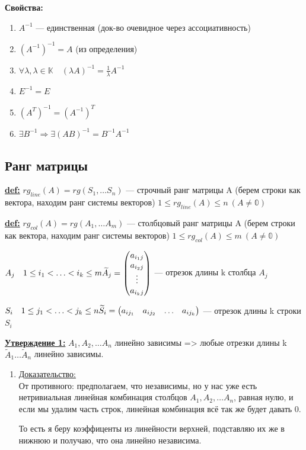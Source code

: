 \documentclass[twoside]{book}
\newcommand{\prooff}[1]{{\underline{Доказательство:}} \\ }
\begin{document}
\textbf{Свойства:}
\begin{enumerate}
    \item $ A^{-1} $ --- единственная (док-во очевидное через ассоциативность)
    \item $ (A^{-1})^{-1} = A $ (из определения)
    \item $ \forall \lambda, \lambda \in \mathbb{K} \quad (\lambda A)^{-1} = \frac{1}{\lambda}A^{-1}$
    \item $ E^{-1} = E $
    \item $ (A^T)^{-1} = (A^{-1})^T $
    \item $ \exists B^{-1} \Rightarrow \exists (AB)^{-1} = B^{-1}A^{-1}$
\end{enumerate}

\subsection{Ранг матрицы}

\textbf{\underline{def:}} $ rg_{line}(A) = rg(S_1, \ldots S_n)$ --- строчный ранг матрицы A (берем строки как вектора, находим ранг системы векторов) $ 1 \leq rg_{line}(A) \leq n \  (A \neq \mathbb{0})$

\textbf{\underline{def:}} $ rg_{col}(A) = rg(A_1, \ldots A_m)$ --- столбцовый ранг матрицы A (берем строки как вектора, находим ранг системы векторов) $ 1 \leq rg_{col}(A) \leq m \  (A \neq \mathbb{0})$

\( A_j \quad 1 \leq i_1 < \ldots <i_k \leq m \newline
\widetilde{A}_j =
\begin{pmatrix}
    a_{i_1j} \\
    a_{i_2j} \\
    \vdots   \\
    a_{i_kj}
\end{pmatrix}
\) --- отрезок длины k столбца $ A_j $

\( S_i \quad 1 \leq j_1 < \ldots < j_k \leq n \newline
\widetilde{S}_i =
\begin{pmatrix}
    a_{ij_1} & a_{ij_2} & \ldots & a_{ij_k}
\end{pmatrix}
\) --- отрезок длины k строки $ S_i $




\textbf{\underline{Утверждение 1:}} $ A_1, A_2, \ldots A_n $ линейно зависимы => любые отрезки длины k $ \widetilde{A}_1 \ldots \widetilde{A}_n $ линейно зависимы.
\begin{enumerate}
    \item[] \prooff{}
          От противного: предполагаем, что независимы, но у нас уже есть нетривиальная линейная комбинация столбцов $ A_1, A_2, \ldots A_n $, равная нулю, и если мы удалим часть строк, линейная комбинация всё так же будет давать 0.

          То есть я беру коэффиценты из линейности верхней, подставляю их же в нижнюю и получаю, что она линейно независима.
\end{enumerate}
\end{document}

